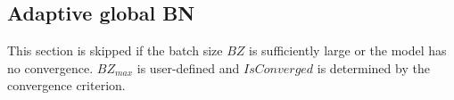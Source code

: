 \subsection{Adaptive global BN}





This section is skipped if the batch size $BZ$ is sufficiently large or the model has no convergence. $BZ_{max}$ is user-defined and $IsConverged$ is determined by the convergence criterion.
 


